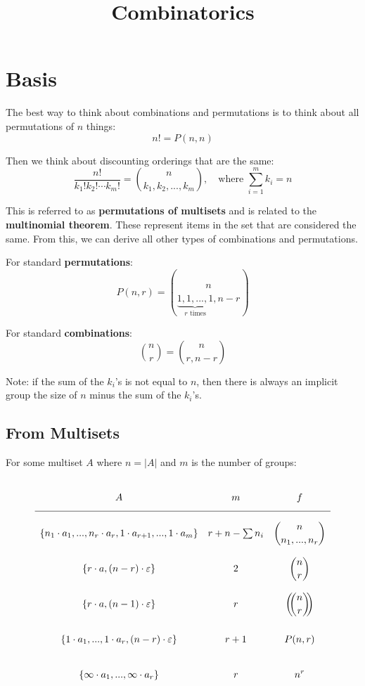 \documentclass{article}
\title{Combinatorics}
\begin{document}
    \maketitle

    \tableofcontents

    \section{Basis}

    The best way to think about combinations and permutations is to think about all permutations of $n$ things: \begin{equation}
        n! = P(n, n)
    \end{equation}

    Then we think about discounting orderings that are the same: \begin{equation}
        \frac{n!}{k_1! k_2! \cdots k_m!} = {n \choose k_1, k_2, ..., k_m}, \quad \text{where } \sum_{i = 1}^m{k_i} = n
    \end{equation}

    This is referred to as \textbf{permutations of multisets} and is related to the \textbf{multinomial theorem}. These represent items in the set that are considered the same. From this, we can derive all other types of combinations and permutations.

    For standard \textbf{permutations}: \begin{equation}
        P(n, r) = {n \choose \underbrace{1, 1, ..., 1}_{r \text{ times}}, n - r}
    \end{equation}

    For standard \textbf{combinations}: \begin{equation}
        {n \choose r} = {n \choose r, n - r}
    \end{equation}

    Note: if the sum of the $k_i$'s is not equal to $n$, then there is always an implicit group the size of $n$ minus the sum of the $k_i$'s.

    \subsection{From Multisets}

    For some multiset $A$ where $n = |A|$ and $m$ is the number of groups: $$\def\arraystretch{3}
    \begin{array}{>{\displaystyle}cc>{\displaystyle}c}
        A & m & f \\
        \hline
        \{n_1 \cdot a_1, ..., n_r \cdot a_r, 1 \cdot a_{r + 1}, ..., 1 \cdot a_m\} & r + n - \sum{n_i} & {n \choose n_1, ..., n_r} \\
        \{r \cdot a, (n - r) \cdot \varepsilon\} & 2 & {n \choose r} \\
        \{r \cdot a, (n - 1) \cdot \varepsilon\} & r & \left(\!\!{n \choose r}\!\!\right) \\
        \{1 \cdot a_1, ..., 1 \cdot a_r, (n - r) \cdot \varepsilon\} & r + 1 & P(n, r) \\
        \{\infty \cdot a_1, ..., \infty \cdot a_r\} & r & n^r \\
    \end{array}$$
\end{document}

